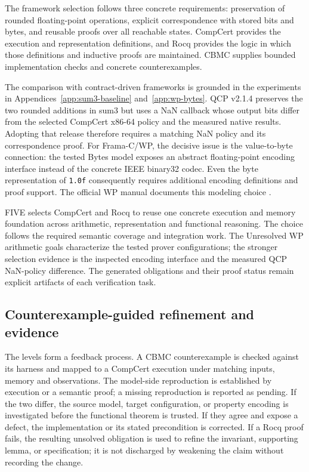 \documentclass[manuscript, screen, review]{acmart}
\begin{document}
\begin{sloppypar}
The framework selection follows three concrete requirements: preservation
of rounded floating-point operations, explicit correspondence with stored
bits and bytes, and reusable proofs over all reachable states. CompCert
provides the execution and representation definitions, and Rocq provides
the logic in which those definitions and inductive proofs are maintained.
CBMC supplies bounded implementation checks and concrete counterexamples.

The comparison with contract-driven frameworks is grounded in the
experiments in Appendices~\ref{app:sum3-baseline} and~\ref{app:wp-bytes}.
QCP v2.1.4 preserves the two rounded additions in sum3 but uses a NaN
callback whose output bits differ from the selected CompCert x86-64
policy and the measured native results. Adopting that release therefore
requires a matching NaN policy and its correspondence proof. For
Frama-C/WP, the decisive issue is the value-to-byte connection: the tested
Bytes model exposes an abstract floating-point encoding interface instead
of the concrete IEEE binary32 codec. Even the byte representation of
\texttt{1.0f} consequently requires additional encoding definitions and
proof support. The official WP manual documents this modeling choice
\cite{FramaCWPManual,QCPFloatLib214}.

FIVE selects CompCert and Rocq to reuse one concrete execution and memory
foundation across arithmetic, representation and functional reasoning.
The choice follows the required semantic coverage and integration work.
The Unresolved WP arithmetic goals characterize the tested prover configurations;
the stronger selection evidence is the inspected encoding interface and
the measured QCP NaN-policy difference. The generated obligations and
their proof status remain explicit artifacts of each verification task.
\end{sloppypar}

\subsection{Counterexample-guided refinement and evidence}

The levels form a feedback process. A CBMC counterexample is checked against its harness and mapped to a
CompCert execution under matching inputs, memory and observations. The
model-side reproduction is established by execution or a semantic proof;
a missing reproduction is reported as pending. If the two differ, the source model,
target configuration, or property encoding is investigated before the
functional theorem is trusted. If they agree and expose a defect, the
implementation or its stated precondition is corrected. If a Rocq proof
fails, the resulting unsolved obligation is used to refine the invariant,
supporting lemma, or specification; it is not discharged by weakening the
claim without recording the change.
\end{document}
